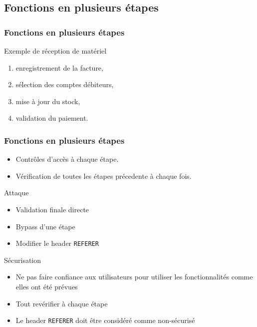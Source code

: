 \documentclass{beamer}
\begin{document}
\subsection{Fonctions en plusieurs étapes}
\begin{frame}
  \frametitle{Fonctions en plusieurs étapes}
  \begin{block}{Exemple de réception de matériel}
    \begin{enumerate}
        \item enregistrement de la facture,
        \item sélection des comptes débiteurs,
        \item mise à jour du stock,
        \item validation du paiement.
    \end{enumerate}
  \end{block}
\end{frame}
\begin{frame}
  \frametitle{Fonctions en plusieurs étapes}  
  \begin{itemize}
    \item Contrôles d'accès à chaque étape.
    \item Vérification de toutes les étapes précedente à chaque fois.
  \end{itemize}
  \begin{alertblock}{Attaque}
    \begin{itemize}
      \item Validation finale directe
      \item Bypass d'une étape
      \item Modifier le header \texttt{REFERER}
    \end{itemize}
  \end{alertblock}
  \begin{exampleblock}{Sécurisation}
    \begin{itemize}
      \item Ne pas faire confiance aux utilisateurs pour utiliser les fonctionnalités comme elles ont été prévues
      \item Tout revérifier à chaque étape
      \item Le header \texttt{REFERER} doit être considéré comme non-sécurisé
    \end{itemize}
  \end{exampleblock}
  
\end{frame}
\end{document}
